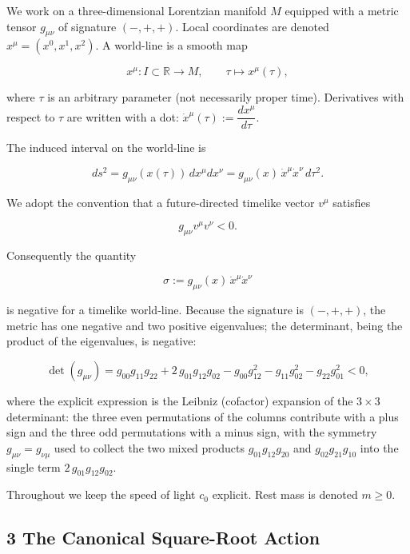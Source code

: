 \documentclass[
]{article}
\begin{document}
We work on a three-dimensional Lorentzian manifold \(M\) equipped with a
metric tensor \(g_{\mu\nu}\) of signature \((-, +, +)\). Local
coordinates are denoted \(x^{\mu} = (x^{0}, x^{1}, x^{2})\). A
world-line is a smooth map

\[x^{\mu} : I \subset \mathbb{R} \longrightarrow M, \qquad \tau \longmapsto x^{\mu}(\tau), \tag{1}\]

where \(\tau\) is an arbitrary parameter (not necessarily proper time).
Derivatives with respect to \(\tau\) are written with a dot:
\(\dot{x}^{\mu}(\tau) := \dfrac{dx^{\mu}}{d\tau}\).

The induced interval on the world-line is

\[ds^{2} = g_{\mu\nu}(x(\tau))\, dx^{\mu} dx^{\nu} = g_{\mu\nu}(x)\, \dot{x}^{\mu} \dot{x}^{\nu}\, d\tau^{2}. \tag{2}\]

We adopt the convention that a future-directed timelike vector
\(v^{\mu}\) satisfies

\[g_{\mu\nu} v^{\mu} v^{\nu} < 0. \tag{3}\]

Consequently the quantity

\[\sigma := g_{\mu\nu}(x)\, \dot{x}^{\mu} \dot{x}^{\nu} \tag{4}\]

is negative for a timelike world-line. Because the signature is
\((-,+,+)\), the metric has one negative and two positive eigenvalues;
the determinant, being the product of the eigenvalues, is negative:

\[\det(g_{\mu\nu}) = g_{00}g_{11}g_{22} + 2\, g_{01}g_{12}g_{02} - g_{00}g_{12}^{2} - g_{11}g_{02}^{2} - g_{22}g_{01}^{2} < 0, \tag{5}\]

where the explicit expression is the Leibniz (cofactor) expansion of the
\(3 \times 3\) determinant: the three even permutations of the columns
contribute with a plus sign and the three odd permutations with a minus
sign, with the symmetry \(g_{\mu\nu} = g_{\nu\mu}\) used to collect the
two mixed products \(g_{01}g_{12}g_{20}\) and \(g_{02}g_{21}g_{10}\)
into the single term \(2\,g_{01}g_{12}g_{02}\).

Throughout we keep the speed of light \(c_{0}\) explicit. Rest mass is
denoted \(m \geq 0\).

\hypertarget{the-canonical-square-root-action}{%
\subsection{3 The Canonical Square-Root
Action}\label{the-canonical-square-root-action}}
\end{document}

